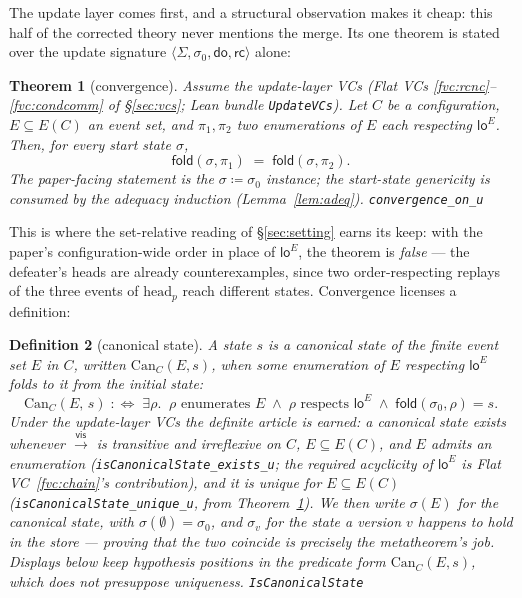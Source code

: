 \documentclass[11pt]{article}
\newtheorem{theorem}{Theorem}[section]
\newtheorem{definition}[theorem]{Definition}
\newcommand{\vis}{\xrightarrow{\mathsf{vis}}}
\newcommand{\rcrel}{\mathsf{rc}}                 %
\newcommand{\Sinit}{\sigma_0}
\newcommand{\loE}[1]{\mathsf{lo}^{#1}}
\newcommand{\lean}[1]{\texttt{#1}}
\newcommand{\fold}{\mathsf{fold}}
\begin{document}
The update layer comes first, and a structural observation makes it
cheap: this half of the corrected theory never mentions the merge. Its
one theorem is stated over the update signature $\langle \Sigma, \Sinit,
\mathsf{do}, \rcrel\rangle$ alone:

\begin{theorem}[convergence]
\label{thm:conv}
Assume the update-layer VCs (Flat VCs
\ref{fvc:rcnc}--\ref{fvc:condcomm} of \S\ref{sec:vcs}; Lean bundle
\lean{UpdateVCs}). Let $C$ be a configuration, $E \subseteq E(C)$ an
event set, and $\pi_1, \pi_2$ two enumerations of $E$ each respecting
$\loE{E}$. Then, for \emph{every} start state $\sigma$,
\[
  \fold(\sigma, \pi_1) \;=\; \fold(\sigma, \pi_2) .
\]
The paper-facing statement is the $\sigma \coloneqq \Sinit$ instance;
the start-state genericity is consumed by the adequacy induction
(Lemma~\ref{lem:adeq}).
\hfill\lean{convergence\_on\_u}
\end{theorem}

This is where the set-relative reading of \S\ref{sec:setting} earns
its keep: with the paper's configuration-wide order in place of
$\loE{E}$, the theorem is \emph{false} --- the defeater's heads are
already counterexamples, since two order-respecting replays of the
three events of $\mathrm{head}_p$ reach different states. Convergence
licenses a definition:

\begin{definition}[canonical state]
\label{def:sigma}
A state $s$ is \emph{a canonical state of} the finite event set $E$ in
$C$, written $\mathrm{Can}_C(E, s)$, when some enumeration of $E$
respecting $\loE{E}$ folds to it from the initial state:
\[
  \mathrm{Can}_C(E,\, s) \;:\Longleftrightarrow\; \exists \rho.\;\;
  \rho \text{ enumerates } E \;\wedge\;
  \rho \text{ respects } \loE{E} \;\wedge\;
  \fold(\Sinit, \rho) = s .
\]
Under the update-layer VCs the definite article is earned: a canonical
state \emph{exists} whenever $\vis$ is transitive and irreflexive on
$C$, $E \subseteq E(C)$, and $E$ admits an enumeration
(\lean{isCanonicalState\_exists\_u}; the required acyclicity of
$\loE{E}$ is Flat VC~\ref{fvc:chain}'s contribution), and it is
\emph{unique} for $E \subseteq E(C)$
(\lean{isCanonicalState\_unique\_u}, from Theorem~\ref{thm:conv}). We
then write $\sigma(E)$ for the canonical state, with
$\sigma(\emptyset) = \Sinit$, and $\sigma_v$ for the state a version
$v$ happens to hold in the store --- proving that the two coincide is
precisely the metatheorem's job. Displays below keep hypothesis
positions in the predicate form $\mathrm{Can}_C(E, s)$, which does not
presuppose uniqueness.
\hfill\lean{IsCanonicalState}
\end{definition}
\end{document}
